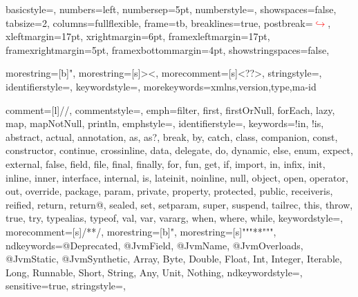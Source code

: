 
\usepackage{listings}

\lstset
{
	basicstyle=\tiny,
	numbers=left,
	numbersep=5pt,
	numberstyle=\tiny\color{gray},
	showspaces=false,
	tabsize=2,
	columns=fullflexible,
	frame=tb,
	breaklines=true,
	postbreak=\mbox{\textcolor{red}{$\hookrightarrow$}\space},
	xleftmargin=17pt,
	xrightmargin=6pt,
	framexleftmargin=17pt,
	framexrightmargin=5pt,
	framexbottommargin=4pt,
    showstringspaces=false,
}

{
	morestring=[b]",
	morestring=[s]{>}{<},
	morecomment=[s]{<?}{?>},
	stringstyle=\color{black},
	identifierstyle=\color{black},
	keywordstyle=\color{cyan},
	morekeywords={xmlns,version,type,ma-id}%
}

{
	comment=[l]{//},
	commentstyle={\color{gray}\ttfamily},
	emph={filter, first, firstOrNull, forEach, lazy, map, mapNotNull, println},
	emphstyle={\color{OrangeRed}},
	identifierstyle=\color{black},
	keywords={!in, !is, abstract, actual, annotation, as, as?, break, by, catch, class, companion, const, constructor, continue, crossinline, data, delegate, do, dynamic, else, enum, expect, external, false, field, file, final, finally, for, fun, get, if, import, in, infix, init, inline, inner, interface, internal, is, lateinit, noinline, null, object, open, operator, out, override, package, param, private, property, protected, public, receiveris, reified, return, return@, sealed, set, setparam, super, suspend, tailrec, this, throw, true, try, typealias, typeof, val, var, vararg, when, where, while},
	keywordstyle={\color{NavyBlue}\bfseries},
	morecomment=[s]{/*}{*/},
	morestring=[b]",
	morestring=[s]{"""*}{*"""},
	ndkeywords={@Deprecated, @JvmField, @JvmName, @JvmOverloads, @JvmStatic, @JvmSynthetic, Array, Byte, Double, Float, Int, Integer, Iterable, Long, Runnable, Short, String, Any, Unit, Nothing},
	ndkeywordstyle={\color{BurntOrange}\bfseries},
	sensitive=true,
	stringstyle={\color{ForestGreen}\ttfamily},
}